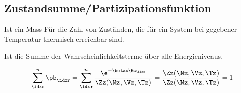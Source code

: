 \subsection{Zustandsumme/Partizipationsfunktion}
\label{subsec:Zustandsumme/Partizipationsfunktion}
\begin{defnbox}\nospacing
  \begin{defn}[Zustandssumme]
    \begin{numberlist}
        \item Ist ein Mass Für die Zahl von Zuständen, die für ein System bei gegebener
    Temperatur thermisch erreichbar sind.
      \item Ist die Summe der Wahrscheinlichkeitsterme über alle Energieniveaus.
    \end{numberlist}
  \end{defn}
\end{defnbox}
\begin{notebox}[Eigenschaften]\nospacing
  \begin{numberlist}
    \item
      \begin{align*}
        \sum_{\idxr}^{n}\pb_{\idxr}=\sum_{\idxr}^{n}\frac{\e^{-\betac\Ez_{\idxr}}}{\Zz(\Nz,\Vz,\Tz)}=\frac{\Zz(\Nz,\Vz,\Tz)}{\Zz(\Nz,\Vz,\Tz)}=1
      \end{align*}
  \end{numberlist}
\end{notebox}
